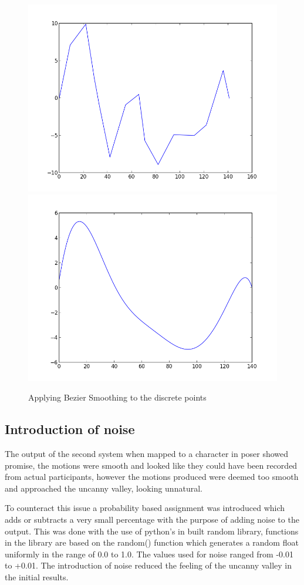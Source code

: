 \documentclass[bsc,frontabs,twoside,singlespacing,parskip]{infthesis}
\begin{document}

\begin{figure}
	\includegraphics[width=.5\textwidth]{figure_1.png}
	\includegraphics[width=.5\textwidth]{figure_2.png}
	\caption{Applying Bezier Smoothing to the discrete points}
\end{figure}

\subsection{Introduction of noise}

The output of the second system when mapped to a character in poser showed promise, the motions were smooth and looked like they could have been recorded from actual participants, however the motions produced were deemed too smooth and approached the uncanny valley, looking unnatural.

To counteract this issue a probability based assignment was introduced which adds or subtracts a very small percentage with the purpose of adding noise to the output. This was done with the use of python's in built random library, functions in the library are based on the random() function which generates a random float uniformly in the range of 0.0 to 1.0. The values used for noise ranged from -0.01 to +0.01. The introduction of noise reduced the feeling of the uncanny valley in the initial results.
\end{document}
